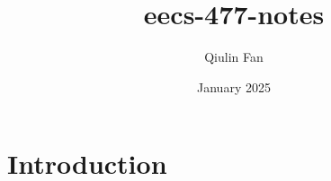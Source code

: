\documentclass{article}
\title{eecs-477-notes}
\author{Qiulin Fan}
\date{January 2025}
\begin{document}
\maketitle

\section{Introduction}
\end{document}
